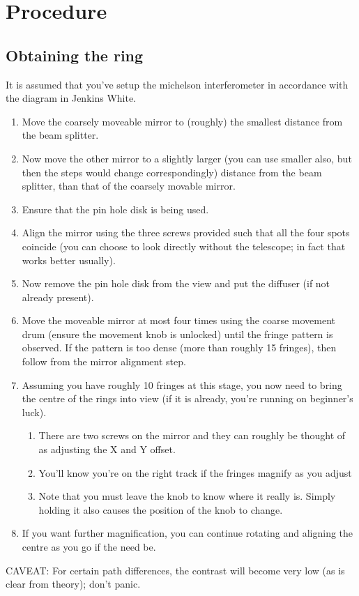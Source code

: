 \section{Procedure}	
	\subsection{Obtaining the ring}
		It is assumed that you've setup the michelson interferometer in accordance with the diagram in Jenkins White.
		\begin{enumerate}
			\item Move the coarsely moveable mirror to (roughly) the smallest distance from the beam splitter.
			\item Now move the other mirror to a slightly larger (you can use smaller also, but then the steps would change correspondingly) distance from the beam splitter, than that of the coarsely movable mirror.
			\item Ensure that the pin hole disk is being used.
			\item Align the mirror using the three screws provided such that all the four spots coincide (you can choose to look directly without the telescope; in fact that works better usually).
			\item Now remove the pin hole disk from the view and put the diffuser (if not already present).
			\item Move the moveable mirror at most four times using the coarse movement drum (ensure the movement knob is unlocked) until the fringe pattern is observed. If the pattern is too dense (more than roughly 15 fringes), then follow from the mirror alignment step.
			\item Assuming you have roughly 10 fringes at this stage, you now need to bring the centre of the rings into view (if it is already, you're running on beginner's luck).
			\begin{enumerate}
				\item There are two screws on the mirror and they can roughly be thought of as adjusting the X and Y offset.
				\item You'll know you're on the right track if the fringes magnify as you adjust
				\item Note that you must leave the knob to know where it really is. Simply holding it also causes the position of the knob to change.
			\end{enumerate}
			\item If you want further magnification, you can continue rotating and aligning the centre as you go if the need be.
		\end{enumerate}
		CAVEAT: For certain path differences, the contrast will become very low (as is clear from theory); don't panic.
